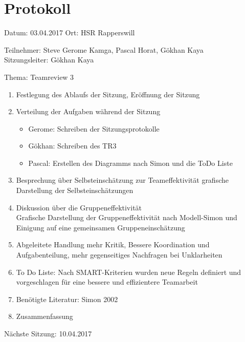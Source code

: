 \chapter{Protokoll}

Datum: 03.04.2017
Ort: HSR Rapperswill

Teilnehmer: Steve Gerome Kamga, Pascal Horat, Gökhan Kaya\\
Sitzungsleiter: Gökhan Kaya

Thema: Teamreview 3

\begin{enumerate}

\item Festlegung des Ablaufs der Sitzung, Eröffnung der Sitzung 

\item  Verteilung der Aufgaben während der Sitzung
\begin{itemize}
\item Gerome: Schreiben der Sitzungsprotokolle
\item Gökhan: Schreiben des TR3
\item Pascal: Erstellen des Diagramms nach Simon und die ToDo Liste
\end{itemize}

\item Besprechung über Selbsteinschätzung zur Teameffektivität
 grafische Darstellung der Selbsteinschätzungen

\item Diskussion über die Gruppeneffektivität\\
Grafische Darstellung der Gruppeneffektivität nach Modell-Simon und Einigung auf eine gemeinsamen Gruppeneinschätzung

\item Abgeleitete Handlung
mehr Kritik, Bessere Koordination und Aufgabenteilung, mehr gegenseitiges Nachfragen bei Unklarheiten

\item To Do Liste: Nach SMART-Kriterien wurden neue Regeln definiert und vorgeschlagen für eine bessere und effizientere Teamarbeit

\item Benötigte Literatur: Simon 2002 \cite{simon2002entwicklung}

\item Zusammenfassung

\end{enumerate}

Nächste Sitzung: 10.04.2017